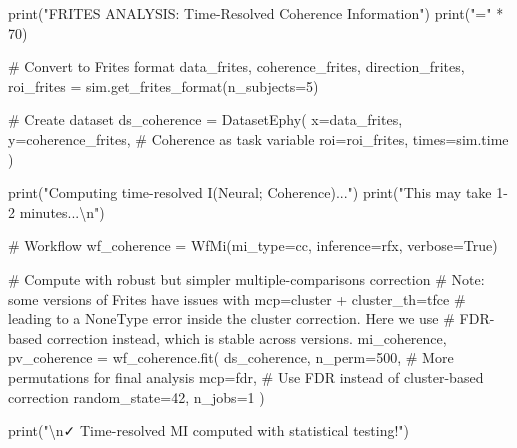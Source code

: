 \documentclass[
  11pt,
  letterpaper,
  oneside,
  openany]{book}
\newenvironment{Shaded}{\begin{snugshade}}{\end{snugshade}}
\newcommand{\BuiltInTok}[1]{\textcolor[rgb]{0.00,0.23,0.31}{#1}}
\newcommand{\CharTok}[1]{\textcolor[rgb]{0.13,0.47,0.30}{#1}}
\newcommand{\CommentTok}[1]{\textcolor[rgb]{0.37,0.37,0.37}{#1}}
\newcommand{\DecValTok}[1]{\textcolor[rgb]{0.68,0.00,0.00}{#1}}
\newcommand{\NormalTok}[1]{\textcolor[rgb]{0.00,0.23,0.31}{#1}}
\newcommand{\OperatorTok}[1]{\textcolor[rgb]{0.37,0.37,0.37}{#1}}
\newcommand{\StringTok}[1]{\textcolor[rgb]{0.13,0.47,0.30}{#1}}
\newcommand{\VariableTok}[1]{\textcolor[rgb]{0.07,0.07,0.07}{#1}}
\begin{document}
\begin{Shaded}
\begin{Highlighting}[]
\BuiltInTok{print}\NormalTok{(}\StringTok{"FRITES ANALYSIS: Time{-}Resolved Coherence Information"}\NormalTok{)}
\BuiltInTok{print}\NormalTok{(}\StringTok{"="} \OperatorTok{*} \DecValTok{70}\NormalTok{)}

\CommentTok{\# Convert to Frites format}
\NormalTok{data\_frites, coherence\_frites, direction\_frites, roi\_frites }\OperatorTok{=}\NormalTok{ sim.get\_frites\_format(n\_subjects}\OperatorTok{=}\DecValTok{5}\NormalTok{)}

\CommentTok{\# Create dataset}
\NormalTok{ds\_coherence }\OperatorTok{=}\NormalTok{ DatasetEphy(}
\NormalTok{    x}\OperatorTok{=}\NormalTok{data\_frites,}
\NormalTok{    y}\OperatorTok{=}\NormalTok{coherence\_frites,  }\CommentTok{\# Coherence as task variable}
\NormalTok{    roi}\OperatorTok{=}\NormalTok{roi\_frites,}
\NormalTok{    times}\OperatorTok{=}\NormalTok{sim.time}
\NormalTok{)}

\BuiltInTok{print}\NormalTok{(}\StringTok{"Computing time{-}resolved I(Neural; Coherence)..."}\NormalTok{)}
\BuiltInTok{print}\NormalTok{(}\StringTok{"This may take 1{-}2 minutes...}\CharTok{\textbackslash{}n}\StringTok{"}\NormalTok{)}

\CommentTok{\# Workflow}
\NormalTok{wf\_coherence }\OperatorTok{=}\NormalTok{ WfMi(mi\_type}\OperatorTok{=}\StringTok{\textquotesingle{}cc\textquotesingle{}}\NormalTok{, inference}\OperatorTok{=}\StringTok{\textquotesingle{}rfx\textquotesingle{}}\NormalTok{, verbose}\OperatorTok{=}\VariableTok{True}\NormalTok{)}

\CommentTok{\# Compute with robust but simpler multiple{-}comparisons correction}
\CommentTok{\# Note: some versions of Frites have issues with mcp=\textquotesingle{}cluster\textquotesingle{} + cluster\_th=\textquotesingle{}tfce\textquotesingle{}}
\CommentTok{\# leading to a NoneType error inside the cluster correction. Here we use}
\CommentTok{\# FDR{-}based correction instead, which is stable across versions.}
\NormalTok{mi\_coherence, pv\_coherence }\OperatorTok{=}\NormalTok{ wf\_coherence.fit(}
\NormalTok{    ds\_coherence,}
\NormalTok{    n\_perm}\OperatorTok{=}\DecValTok{500}\NormalTok{,  }\CommentTok{\# More permutations for final analysis}
\NormalTok{    mcp}\OperatorTok{=}\StringTok{\textquotesingle{}fdr\textquotesingle{}}\NormalTok{,   }\CommentTok{\# Use FDR instead of cluster{-}based correction}
\NormalTok{    random\_state}\OperatorTok{=}\DecValTok{42}\NormalTok{,}
\NormalTok{    n\_jobs}\OperatorTok{=}\DecValTok{1}
\NormalTok{)}

\BuiltInTok{print}\NormalTok{(}\StringTok{"}\CharTok{\textbackslash{}n}\StringTok{✓ Time{-}resolved MI computed with statistical testing!"}\NormalTok{)}
\end{Highlighting}
\end{Shaded}
\end{document}

